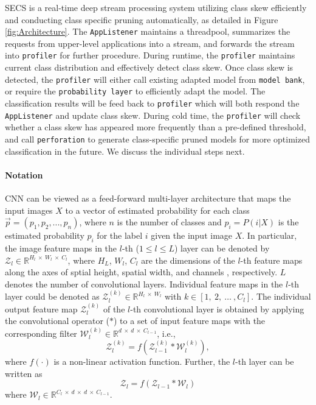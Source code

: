 \documentclass[pageno]{jpaper}
\begin{document}
SECS is a real-time deep stream processing system utilizing class skew efficiently and conducting class specific pruning automatically, as detailed in Figure \ref{fig:Architecture}. The \texttt{AppListener} maintains a threadpool, summarizes the requests from upper-level applications into a stream, and forwards the stream into \texttt{profiler} for further procedure. During runtime, the \texttt{profiler} maintains current class distribution and effectively detect class skew. Once class skew is detected, the \texttt{profiler} will either call existing adapted model from \texttt{model bank}, or require the \texttt{probability layer} to efficiently adapt the model. The classification results will be feed back to \texttt{profiler} which will both respond the \texttt{AppListener} and update class skew. During cold time, the \texttt{profiler} will check whether a class skew has appeared more frequently than a pre-defined threshold, and call \texttt{perforation} to generate class-specific pruned models for more optimized classification in the future. We discuss the individual steps next.






\paragraph{Notation}
CNN can be viewed as a feed-forward multi-layer architecture that maps the input images $X$ to a vector of estimated probability for each class $\vec{p} = (p_1, p_2, ..., p_n)$, where $n$ is the number of classes and $p_i = P(i|X)$ is the estimated probability $p_i$ for the label $i$ given the input image $X$. In particular, the image feature maps in the $l$-th ($1 \leqslant l \leqslant L$) layer can be denoted by $\mathcal{Z}_l \in \mathbb{R}^{H_l \: \times \: W_l \: \times \: C_l}$, where $H_L$, $W_l$, $C_l$ are the dimensions of the $l$-th feature maps along the axes of sptial height, spatial width, and channels , respectively. $L$ denotes the number of convolutional layers. Individual feature maps in the $l$-th layer could be denoted as $\mathcal{Z}_l^{(k)} \in \mathbb{R}^{H_l \: \times \: W_l}$ with $k \in [1, \:2, \: \dots \:, C_l]$. The individual output feature map $\mathcal{Z}_l^{(k)}$ of the $l$-th convolutional layer is obtained by applying the convolutional operator ($\ast$) to a set of input feature maps with the corresponding filter $\mathcal{W}_l^{(k)} \in \mathbb{R}^{d \: \times \: d \: \times \: C_{l-1}}$, i.e.,
\begin{equation}
    \mathcal{Z}_l^{(k)} = f(\mathcal{Z}_{l-1}^{(k)} \ast \mathcal{W}_l^{(k)}),
\end{equation}
where $f(\cdot)$ is a non-linear activation function. Further, the $l$-th layer can be written as
\begin{equation} \label{eq:1}
    \mathcal{Z}_l = f(\mathcal{Z}_{l-1} \ast \mathcal{W}_l)
\end{equation}
where $\mathcal{W}_l \in \mathbb{R}^{C_l \: \times \:   d \: \times \: d \: \times \: C_{l-1}}$.
\end{document}
